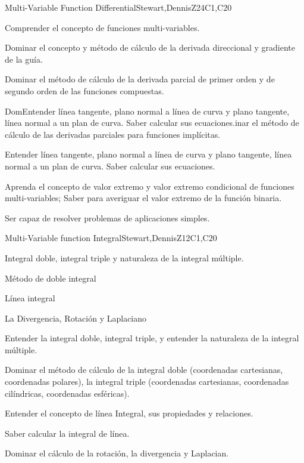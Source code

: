 \begin{syllabus}
\begin{unit}{Multi-Variable Function Differential}{}{Stewart,DennisZ}{24}{C1,C20}
   \begin{learningoutcomes}
    \item Comprender el concepto de funciones multi-variables.
    \item Dominar el concepto y método de cálculo de la derivada direccional y gradiente de la guía.
    \item Dominar el método de cálculo de la derivada parcial de primer orden y de segundo orden de las funciones compuestas.
    \item DomEntender línea tangente, plano normal a línea de curva y plano tangente, línea normal a un plan de curva. Saber calcular sus ecuaciones.inar el método de cálculo de las derivadas parciales para funciones implícitas.
    \item Entender línea tangente, plano normal a línea de curva y plano tangente, línea normal a un plan de curva. Saber calcular sus ecuaciones.
    \item Aprenda el concepto de valor extremo y valor extremo condicional de funciones multi-variables; Saber para averiguar el valor extremo de la función binaria.
    \item Ser capaz de resolver problemas de aplicaciones simples.
    \end{learningoutcomes}
\end{unit}

\begin{unit}{Multi-Variable function Integral}{}{Stewart,DennisZ}{12}{C1,C20}
  \begin{topics}
    \item Integral doble, integral triple y naturaleza de la integral múltiple.
    \item Método de doble integral
    \item Línea integral
    \item La Divergencia, Rotación y Laplaciano
   \end{topics}
  
  \begin{learningoutcomes}
    \item Entender la integral doble, integral triple, y entender la naturaleza de la integral múltiple.
    \item Dominar el método de cálculo de la integral doble (coordenadas cartesianas, coordenadas polares), la integral triple (coordenadas cartesianas, coordenadas cilíndricas, coordenadas esféricas).
    \item Entender el concepto de línea Integral, sus propiedades y relaciones.
    \item Saber calcular la integral de línea.
    \item Dominar el cálculo de la rotación, la divergencia y Laplacian.
  

\end{learningoutcomes}
\end{unit}
\end{syllabus}
